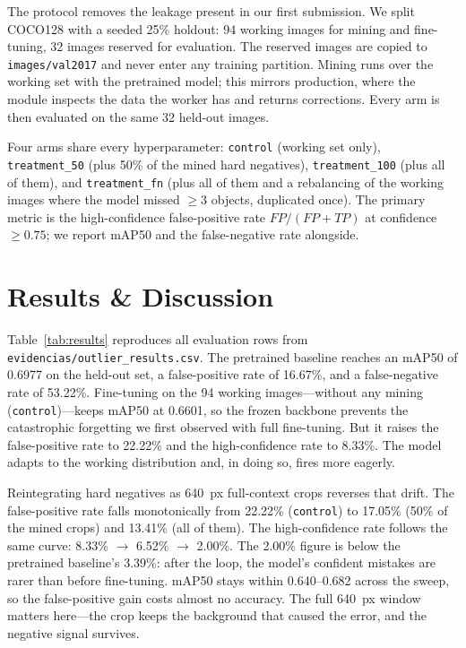 \documentclass[conference]{IEEEtran}
\begin{document}
The protocol removes the leakage present in our first submission. We split
COCO128 with a seeded 25\% holdout: 94 working images for mining and
fine-tuning, 32 images reserved for evaluation. The reserved images are copied
to \texttt{images/val2017} and never enter any training partition. Mining
runs over the working set with the pretrained model; this mirrors production,
where the module inspects the data the worker has and returns corrections.
Every arm is then evaluated on the same 32 held-out images.

Four arms share every hyperparameter: \texttt{control} (working set only),
\texttt{treatment\_50} (plus 50\% of the mined hard negatives),
\texttt{treatment\_100} (plus all of them), and \texttt{treatment\_fn} (plus
all of them and a rebalancing of the working images where the model missed
\(\geq 3\) objects, duplicated once). The primary metric is the
high-confidence false-positive rate \(FP/(FP+TP)\) at confidence \(\geq 0.75\);
we report mAP50 and the false-negative rate alongside.

\section{Results \& Discussion}
Table~\ref{tab:results} reproduces all evaluation rows from
\texttt{evidencias/outlier\_results.csv}. The pretrained baseline reaches an
mAP50 of 0.6977 on the held-out set, a false-positive rate of 16.67\%, and a
false-negative rate of 53.22\%. Fine-tuning on the 94 working images---without
any mining (\texttt{control})---keeps mAP50 at 0.6601, so the frozen backbone
prevents the catastrophic forgetting we first observed with full fine-tuning.
But it raises the false-positive rate to 22.22\% and the high-confidence rate
to 8.33\%. The model adapts to the working distribution and, in doing so,
fires more eagerly.

Reintegrating hard negatives as 640~px full-context crops reverses that drift.
The false-positive rate falls monotonically from 22.22\% (\texttt{control}) to
17.05\% (50\% of the mined crops) and 13.41\% (all of them). The
high-confidence rate follows the same curve: 8.33\% \(\rightarrow\) 6.52\%
\(\rightarrow\) 2.00\%. The 2.00\% figure is below the pretrained baseline's
3.39\%: after the loop, the model's confident mistakes are rarer than before
fine-tuning. mAP50 stays within 0.640--0.682 across the sweep, so the
false-positive gain costs almost no accuracy. The full 640~px window matters
here---the crop keeps the background that caused the error, and the negative
signal survives.
\end{document}
